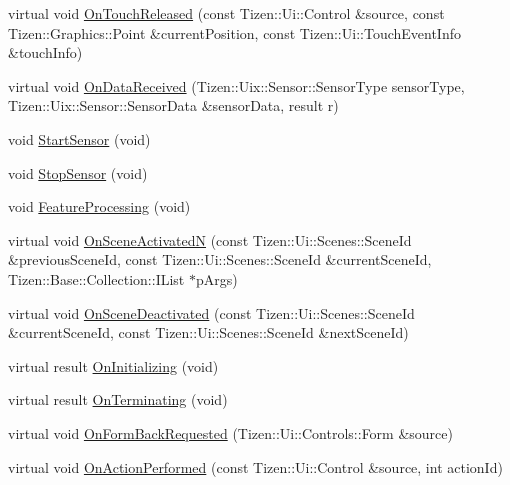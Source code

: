 \begin{DoxyCompactItemize}
\item 
virtual void \hyperlink{class_calculator_form_ab270921ccfd02b9dc7da04b5568cae4e}{On\+Touch\+Released} (const Tizen\+::\+Ui\+::\+Control \&source, const Tizen\+::\+Graphics\+::\+Point \&current\+Position, const Tizen\+::\+Ui\+::\+Touch\+Event\+Info \&touch\+Info)
\item 
virtual void \hyperlink{class_calculator_form_a65cd7728c92b73141787a9c2333462d7}{On\+Data\+Received} (Tizen\+::\+Uix\+::\+Sensor\+::\+Sensor\+Type sensor\+Type, Tizen\+::\+Uix\+::\+Sensor\+::\+Sensor\+Data \&sensor\+Data, result r)
\item 
void \hyperlink{class_calculator_form_afaa8fab392f2dd958cab631e4a2c019f}{Start\+Sensor} (void)
\item 
void \hyperlink{class_calculator_form_a2ea52e1ac047a01188384b416d41c461}{Stop\+Sensor} (void)
\item 
void \hyperlink{class_calculator_form_ae739bb0f8aea14c0ae2d440950130bc2}{Feature\+Processing} (void)
\item 
virtual void \hyperlink{class_calculator_form_afbb0a77caee4d2686ea67ad41a4d431e}{On\+Scene\+Activated\+N} (const Tizen\+::\+Ui\+::\+Scenes\+::\+Scene\+Id \&previous\+Scene\+Id, const Tizen\+::\+Ui\+::\+Scenes\+::\+Scene\+Id \&current\+Scene\+Id, Tizen\+::\+Base\+::\+Collection\+::\+I\+List $\ast$p\+Args)
\item 
virtual void \hyperlink{class_calculator_form_af4b6ee4f7baaec70259f2d631d3152e8}{On\+Scene\+Deactivated} (const Tizen\+::\+Ui\+::\+Scenes\+::\+Scene\+Id \&current\+Scene\+Id, const Tizen\+::\+Ui\+::\+Scenes\+::\+Scene\+Id \&next\+Scene\+Id)
\item 
virtual result \hyperlink{class_calculator_form_a6ffeb117d9770054839979bd5d81913e}{On\+Initializing} (void)
\item 
virtual result \hyperlink{class_calculator_form_a157ce99572a803a9a5638e0a6d60518a}{On\+Terminating} (void)
\item 
virtual void \hyperlink{class_calculator_form_a3736d53b1ad6388353463511485750cf}{On\+Form\+Back\+Requested} (Tizen\+::\+Ui\+::\+Controls\+::\+Form \&source)
\item 
virtual void \hyperlink{class_calculator_form_af30252093893f4cb4d5578e919d3381f}{On\+Action\+Performed} (const Tizen\+::\+Ui\+::\+Control \&source, int action\+Id)
\end{DoxyCompactItemize}
